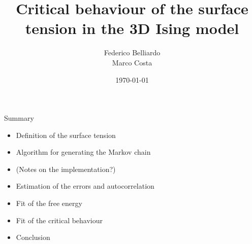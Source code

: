 \documentclass[12pt,handout]{beamer}
\title[]{Critical behaviour of the surface tension in the 3D Ising model} %
\author[]
{
Federico Belliardo \\
Marco Costa
}
\institute[] %
{
Dipartimento di Fisica\\ %
Università di Pisa \\
\medskip
}
\date{\today} %
\begin{document}
\begin{frame}
\titlepage %
\end{frame}



\begin{frame}{Summary}

\begin{center}

\begin{itemize}
\item Definition of the surface tension
\item Algorithm for generating the Markov chain
\item (Notes on the implementation?)
\item Estimation of the errors and autocorrelation
\item Fit of the free energy
\item Fit of the critical behaviour
\item Conclusion
\end{itemize}

\end{center}
\end{frame}
\end{document}
